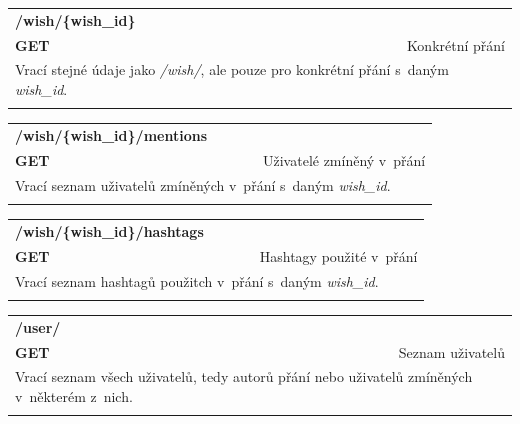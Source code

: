 \documentclass[thesis=B,czech]{FITthesis}[2012/06/26]
\begin{document}
\begin{table}[h]
\begin{tabular}{llllr}
\rowcolor[HTML]{EFEFEF}
\large \textbf{/wish/\{wish\_id\}}        &         &                 &        & \multicolumn{1}{l}{}                \\
\rowcolor[HTML]{EFEFEF}
\textbf{GET}          &         &                 &        & Konkrétní přání                        \\
\multicolumn{5}{l}{\parbox[t]{12.8cm}{Vrací stejné údaje jako \textit{/wish/}, ale pouze pro konkrétní přání s~daným \textit{wish\_id}.}  } \\  
 & & & & \\
\end{tabular}
\end{table}
 

\begin{table}[h]
\begin{tabular}{llllr}
\rowcolor[HTML]{EFEFEF}
\large \textbf{/wish/\{wish\_id\}/mentions}        &         &                 &        & \multicolumn{1}{l}{}                \\
\rowcolor[HTML]{EFEFEF}
\textbf{GET}          &         &                 &        & Uživatelé zmíněný v~přání                        \\
\multicolumn{5}{l}{\parbox[t]{12.8cm}{Vrací seznam uživatelů zmíněných v~přání s~daným \textit{wish\_id}.}  } \\  
 & & & & \\  
\end{tabular}
\end{table}


\begin{table}[h]
\begin{tabular}{llllr}
\rowcolor[HTML]{EFEFEF}
\large \textbf{/wish/\{wish\_id\}/hashtags}        &         &                 &        & \multicolumn{1}{l}{}                \\
\rowcolor[HTML]{EFEFEF}
\textbf{GET}          &         &                 &        & Hashtagy použité v~přání                        \\
\multicolumn{5}{l}{\parbox[t]{12.8cm}{Vrací seznam hashtagů použitch v~přání s~daným \textit{wish\_id}.}  } \\    
 & & & & \\
\end{tabular}
\end{table}

\begin{table}[h]
\begin{tabular}{llllr}
\rowcolor[HTML]{EFEFEF}
\large \textbf{/user/}        &         &                 &        & \multicolumn{1}{l}{}                \\
\rowcolor[HTML]{EFEFEF}
\textbf{GET}          &         &                 &        & Seznam uživatelů                        \\
\multicolumn{5}{l}{\parbox[t]{12.8cm}{Vrací seznam všech uživatelů, tedy autorů přání nebo uživatelů zmíněných v~některém z~nich. }  } \\  
 & & & & \\ 
\end{tabular}
\end{table}
\end{document}
